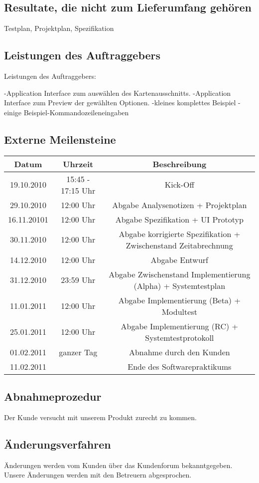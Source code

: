 \documentclass[a4paper,10pt]{scrartcl}
\begin{document}
\subsection{Resultate, die nicht zum Lieferumfang gehören}
Testplan, Projektplan, Spezifikation
\subsection{Leistungen des Auftraggebers}
Leistungen des Auftraggebers:

-Application Interface zum auswählen des Kartenausschnitts.
-Application Interface zum Preview der gewählten Optionen.
-kleines komplettes Beispiel
-einige Beispiel-Kommandozeileneingaben
\subsection{Externe Meilensteine}
\begin{tabular}{|c|c|c|}
\hline Datum & Uhrzeit & Beschreibung\\ 
\hline 19.10.2010 & 15:45 - 17:15 Uhr & Kick-Off\\ 
\hline 29.10.2010 & 12:00 Uhr & Abgabe Analysenotizen + Projektplan\\ 
\hline 16.11.20101 & 12:00 Uhr & Abgabe Spezifikation + UI Prototyp\\ 
\hline 30.11.2010 & 12:00 Uhr & Abgabe korrigierte Spezifikation + Zwischenstand Zeitabrechnung\\ 
\hline 14.12.2010 & 12:00 Uhr & Abgabe Entwurf\\ 
\hline 31.12.2010 & 23:59 Uhr & Abgabe Zwischenstand Implementierung (Alpha) + Systemtestplan\\ 
\hline 11.01.2011 & 12:00 Uhr & Abgabe Implementierung (Beta) + Modultest\\ 
\hline 25.01.2011 & 12:00 Uhr & Abgabe Implementierung (RC) + Systemtestprotokoll\\ 
\hline 01.02.2011 & ganzer Tag & Abnahme durch den Kunden\\ 
\hline 11.02.2011 & & Ende des Softwarepraktikums\\ 
\hline 
\end{tabular} 
\subsection{Abnahmeprozedur}
Der Kunde versucht mit unserem Produkt zurecht zu kommen.
\subsection{Änderungsverfahren}
Änderungen werden vom Kunden über das Kundenforum bekanntgegeben. Unsere Änderungen werden mit den Betreuern abgesprochen.
\end{document}
